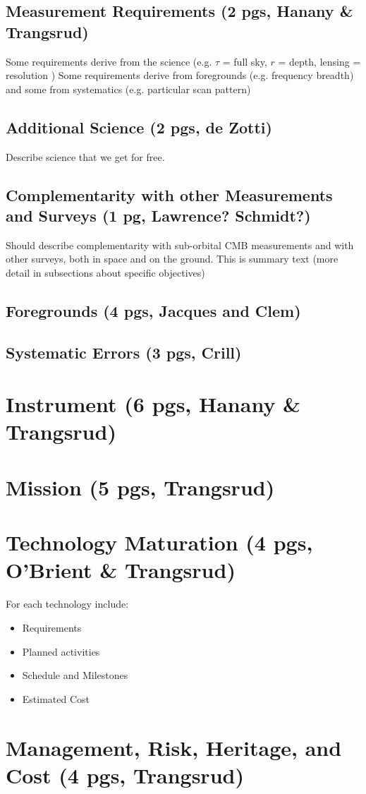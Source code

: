 \documentclass[12pt]{article}
\begin{document}
\subsection{Measurement Requirements (2 pgs, Hanany \& Trangsrud)}

Some requirements derive from the science (e.g. $\tau$ = full sky, $r$ = depth, lensing = resolution )
Some requirements derive from foregrounds (e.g. frequency breadth) and some from systematics (e.g. particular scan pattern)

\subsection{Additional Science (2 pgs, de Zotti)} 

Describe science that we get for free. 

\subsection{Complementarity with other Measurements and Surveys (1 pg, Lawrence? Schmidt?)} 

Should describe complementarity with sub-orbital CMB measurements and with other surveys, 
both in space and on the ground.  This is summary text (more detail in subsections about specific objectives)


\subsection{Foregrounds (4 pgs, Jacques and Clem)}


\subsection{Systematic Errors (3 pgs, Crill)}


\section{Instrument (6 pgs, Hanany \& Trangsrud)}


\section{Mission (5 pgs, Trangsrud)}


\section{Technology Maturation (4 pgs, O'Brient \& Trangsrud)}


For each technology include:
\begin{itemize}
\item Requirements
\item Planned activities
\item Schedule and Milestones
\item Estimated Cost
\end{itemize}

\section{Management, Risk, Heritage, and Cost (4 pgs, Trangsrud)}


\newpage




\end{document}
